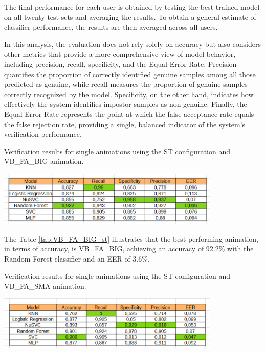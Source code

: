 \documentclass[12pt]{report}
\begin{document}
The final performance for each user is obtained by testing the best-trained model on all twenty test sets and averaging the results.
To obtain a general estimate of classifier performance, the results are then averaged across all users.

In this analysis, the evaluation does not rely solely on accuracy but also considers other metrics that provide a more comprehensive view of model behavior, including precision, recall, specificity, and the Equal Error Rate.
Precision quantifies the proportion of correctly identified genuine samples among all those predicted as genuine, while recall measures the proportion of genuine samples correctly recognized by the model.
Specificity, on the other hand, indicates how effectively the system identifies impostor samples as non-genuine.
Finally, the Equal Error Rate represents the point at which the false acceptance rate equals the false rejection rate, providing a single, balanced indicator of the system's verification performance.

\begin{table}[ht]
    \centering
    \caption{Verification results for single animations using the ST configuration and VB\_FA\_BIG animation.}
    \includegraphics[width=0.8\textwidth]{Images/Results/Verification_single/st/VB_FA_BIG.png}
    \label{tab:VB_FA_BIG_st}
\end{table}

The Table \ref{tab:VB_FA_BIG_st} illustrates that the best-performing animation, in terms of accuracy, is VB\_FA\_BIG, achieving an accuracy of 92.2\% with the Random Forest classifier and an EER of 3.6\%.

\begin{table}[ht]
    \centering
    \caption{Verification results for single animations using the ST configuration and VB\_FA\_SMA animation.}
    \includegraphics[width=0.8\textwidth]{Images/Results/Verification_single/st/VB_FA_LIT.png}
    \label{tab:VB_FA_LIT_st}
\end{table}
\end{document}

